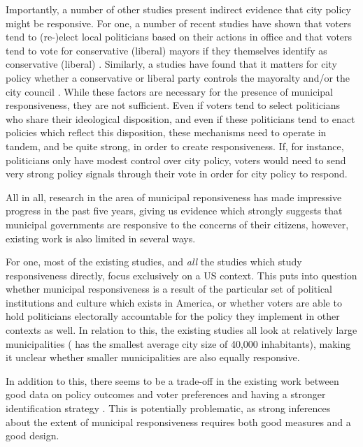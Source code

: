 \documentclass[a4paper,12pt]{article}
\begin{document}
Importantly, a number of other studies present indirect evidence that city policy might be responsive. For one, a number of recent studies have shown that voters tend to (re-)elect local politicians based on their actions in office \citep{arnold2012holding,burnett2017politics} and that voters tend to vote for conservative (liberal)  mayors if they themselves identify as conservative (liberal)   \citep{sances2017ideology,boudreau2015lost,hopkins2017retrospective}. Similarly, a studies have found that it matters for city policy whether a conservative or liberal party controls the mayoralty and/or the city council \citep{fiva2016power,folke2014shades,blom2006parties,de2016mayoral}. While these factors are necessary for the presence of municipal responsiveness, they are not sufficient. Even if voters tend to select politicians who share their ideological disposition, and even if these politicians tend to enact policies which reflect this disposition, these mechanisms need to operate in tandem, and be quite strong, in order to create responsiveness. If, for instance, politicians only have modest control over city policy, voters would need to send very strong policy signals through their vote in order for city policy to respond. 

All in all, research in the area of municipal reponsiveness has made impressive progress in the past five years, giving us evidence which strongly suggests that municipal governments are responsive to the concerns of their citizens, however, existing work is also limited in several ways. 

For one, most of the existing studies, and \textit{all} the studies which study responsiveness directly,  focus exclusively on a US context. This puts into question whether municipal responsiveness is a result of the particular set of political institutions and culture which exists in America, or whether voters are able to hold politicians electorally accountable for the policy they implement in other contexts as well. In relation to this, the existing studies all look at relatively large municipalities (\citealp{einstein2016pushing} has the smallest average city size of 40,000 inhabitants), making it unclear whether smaller municipalities are also equally responsive.

In addition to this, there seems to be a trade-off in the existing work between good data on policy outcomes and voter preferences \citep[cf.]{tausanovitch2014representation} and having a stronger identification strategy \citep[cf.]{sances2017voters}. This is potentially problematic, as strong inferences about the extent of municipal responsiveness requires both good measures and a good design.
\end{document}
